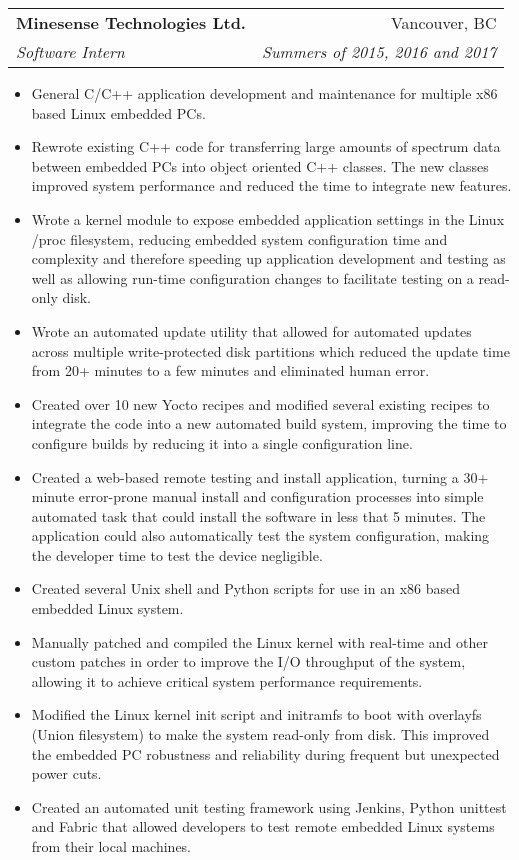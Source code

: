 \documentclass[letterpaper,11pt]{article}
\makeatletter
\newcommand{\resumeItem}[2]{
  \item\small{
    \textbf{#1}{#2 \vspace{-2pt}}
  }
}
\newcommand{\resumeSubheading}[4]{
  \vspace{-1pt}\item
    \begin{tabular*}{0.97\textwidth}[t]{l@{\extracolsep{\fill}}r}
      \textbf{#1} & #2 \\
      \textit{\small#3} & \textit{\small #4} \\
    \end{tabular*}\vspace{-5pt}
}
\newcommand{\resumeItemListStart}{\begin{itemize}}
\newcommand{\resumeItemListEnd}{\end{itemize}\vspace{-5pt}}
\makeatother
\begin{document}
    \resumeSubheading
      {Minesense Technologies Ltd.}{Vancouver, BC} 
      {Software Intern}{Summers of 2015, 2016 and 2017}
      \resumeItemListStart
        \resumeItem{} {General C/C++ application development and maintenance for multiple x86 based Linux embedded PCs.}
        \resumeItem{} {Rewrote existing C++ code for transferring large amounts of spectrum data between embedded PCs into object oriented C++ classes. The new classes improved system performance and reduced the time to integrate new features.}
        \resumeItem{} {Wrote a kernel module to expose embedded application settings in the Linux /proc filesystem, reducing embedded system configuration time and complexity and therefore speeding up application development and testing as well as allowing run-time configuration changes to facilitate testing on a read-only disk.}
        \resumeItem{} {Wrote an automated update utility that allowed for automated updates across multiple write-protected disk partitions which reduced the update time from 20+ minutes to a few minutes and eliminated human error.}
        \resumeItem{} {Created over 10 new Yocto recipes and modified several existing recipes to integrate the code into a new automated build system, improving the time to configure builds by reducing it into a single configuration line.}
        \resumeItem{} {Created a web-based remote testing and install application, turning a 30+ minute error-prone manual install and configuration processes into simple automated task that could install the software in less that 5 minutes. The application could also automatically test the system configuration, making the developer time to test the device negligible.}

        \resumeItem{} {Created several Unix shell and Python scripts for use in an x86 based embedded Linux system.}
        \resumeItem{} {Manually patched and compiled the Linux kernel with real-time and other custom patches in order to improve the I/O throughput of the system, allowing it to achieve critical system performance requirements.}
        \resumeItem{} {Modified the Linux kernel init script and initramfs to boot with overlayfs (Union filesystem) to make the system read-only from disk. This improved the embedded PC robustness and reliability during frequent but unexpected power cuts.}

        \resumeItem{} {Created an automated unit testing framework using Jenkins, Python unittest and Fabric that allowed developers to test remote embedded Linux systems from their local machines.}
      \resumeItemListEnd
\end{document}
